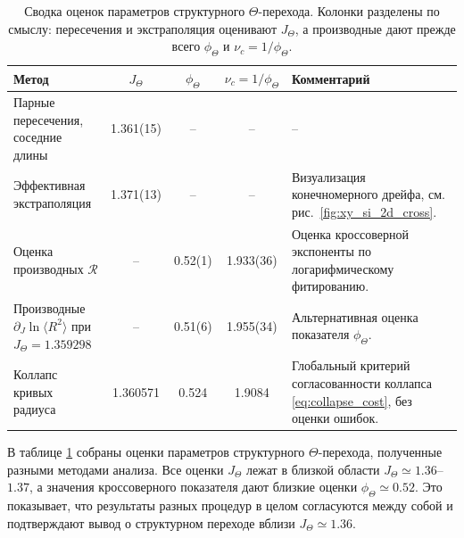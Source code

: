 
 \begin{table}[htbp]
 	\centering
 	\small
 	\setlength{\tabcolsep}{4pt}
 	\renewcommand{\arraystretch}{1.15}
 	
 	\caption{Сводка оценок параметров структурного $\Theta$-перехода. 
 		Колонки разделены по смыслу: пересечения и экстраполяция оценивают 
 		$J_\Theta$, а производные дают прежде всего $\phi_\Theta$ и 
 		$\nu_c=1/\phi_\Theta$.}
 	\label{tab:theta_summary}
 	
 	\begin{tabularx}{\textwidth}{
 			>{\raggedright\arraybackslash}p{}
 			c
 			c
 			c
 			>{\raggedright\arraybackslash}X
 		}
 		\toprule
 		Метод 
 		& $J_\Theta$ 
 		& $\phi_\Theta$ 
 		& $\nu_c=1/\phi_\Theta$ 
 		& Комментарий \\
 		\midrule
 		
 		Парные пересечения, соседние длины 
 		& 1.361(15) 
 		& -- 
 		& -- 
 		& -- \\
 		
 		Эффективная экстраполяция  
 		& 1.371(13) 
 		& -- 
 		& -- 
 		& Визуализация конечномерного дрейфа, см. рис.~\ref{fig:xy_si_2d_cross}. \\
 		
 		Оценка производных $\mathcal{R}$   
 		& -- 
 		& 0.52(1) 
 		& 1.933(36) 
 		& Оценка кроссоверной экспоненты по логарифмическому фитированию. \\
 		
 		Производные $\partial_J \ln\langle R^2\rangle$ при $J_\Theta=1.359298$ 
 		& -- 
 		& 0.51(6) 
 		& 1.955(34) 
 		& Альтернативная оценка показателя $\phi_\Theta$. \\
 		
 		Коллапс кривых радиуса 
 		& 1.360571 
 		& 0.524 
 		& 1.9084 
 		& Глобальный критерий согласованности коллапса \eqref{eq:collapse_cost}, без оценки ошибок. \\
 		\bottomrule
 	\end{tabularx}
 \end{table} 
 
 
В таблице \ref{tab:theta_summary} собраны оценки параметров структурного $\Theta$-перехода, полученные разными методами анализа.
 Все оценки $J_\Theta$ лежат в близкой области $J_\Theta \simeq 1.36$--$1.37$, а значения кроссоверного показателя дают близкие оценки $\phi_\Theta \simeq 0.52$. Это показывает, что результаты разных процедур в целом согласуются между собой и подтверждают вывод о структурном переходе вблизи $J_\Theta\simeq 1.36$.
 
